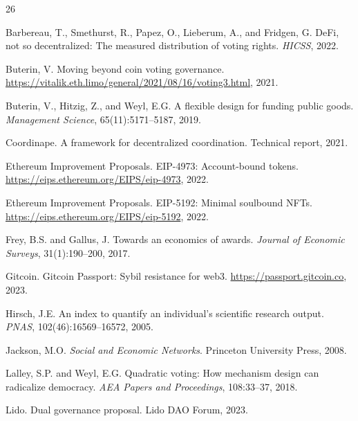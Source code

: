 \documentclass[11pt,letterpaper]{article}
\begin{document}
\begin{thebibliography}{26}

Barbereau, T., Smethurst, R., Papez, O., Lieberum, A., and Fridgen, G.
\newblock DeFi, not so decentralized: The measured distribution of voting rights.
\newblock \emph{HICSS}, 2022.

Buterin, V.
\newblock Moving beyond coin voting governance.
\newblock \url{https://vitalik.eth.limo/general/2021/08/16/voting3.html}, 2021.

Buterin, V., Hitzig, Z., and Weyl, E.G.
\newblock A flexible design for funding public goods.
\newblock \emph{Management Science}, 65(11):5171--5187, 2019.

Coordinape.
\newblock A framework for decentralized coordination.
\newblock Technical report, 2021.

Ethereum Improvement Proposals.
\newblock EIP-4973: Account-bound tokens.
\newblock \url{https://eips.ethereum.org/EIPS/eip-4973}, 2022.

Ethereum Improvement Proposals.
\newblock EIP-5192: Minimal soulbound NFTs.
\newblock \url{https://eips.ethereum.org/EIPS/eip-5192}, 2022.

Frey, B.S. and Gallus, J.
\newblock Towards an economics of awards.
\newblock \emph{Journal of Economic Surveys}, 31(1):190--200, 2017.

Gitcoin.
\newblock Gitcoin Passport: Sybil resistance for web3.
\newblock \url{https://passport.gitcoin.co}, 2023.

Hirsch, J.E.
\newblock An index to quantify an individual's scientific research output.
\newblock \emph{PNAS}, 102(46):16569--16572, 2005.

Jackson, M.O.
\newblock \emph{Social and Economic Networks}.
\newblock Princeton University Press, 2008.

Lalley, S.P. and Weyl, E.G.
\newblock Quadratic voting: How mechanism design can radicalize democracy.
\newblock \emph{AEA Papers and Proceedings}, 108:33--37, 2018.

Lido.
\newblock Dual governance proposal.
\newblock Lido DAO Forum, 2023.


\end{thebibliography}
\end{document}
